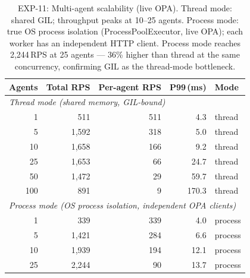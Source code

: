 \begin{table}[t]
\centering
\small
\caption{EXP-11: Multi-agent scalability (live OPA).
  Thread mode: shared GIL; throughput peaks at 10--25 agents.
  Process mode: true OS process isolation (ProcessPoolExecutor, live OPA);
  each worker has an independent HTTP client.
  Process mode reaches 2{,}244\,RPS at 25 agents — 36\% higher than thread
  at the same concurrency, confirming GIL as the thread-mode bottleneck.}
\label{tab:exp11-agents}
\begin{tabular}{rrrrl}
\hline
\textbf{Agents} & \textbf{Total RPS} & \textbf{Per-agent RPS} & \textbf{P99\,(ms)} & \textbf{Mode} \\
\hline
\multicolumn{5}{l}{\textit{Thread mode (shared memory, GIL-bound)}} \\
 1  &   511 &   511 &  4.3 & thread \\
 5  & 1{,}592 &   318 &  5.0 & thread \\
10  & 1{,}658 &   166 &  9.2 & thread \\
25  & 1{,}653 &    66 & 24.7 & thread \\
50  & 1{,}472 &    29 & 59.7 & thread \\
100 &   891 &     9 & 170.3 & thread \\
\hline
\multicolumn{5}{l}{\textit{Process mode (OS process isolation, independent OPA clients)}} \\
 1  &   339 &   339 &  4.0 & process \\
 5  & 1{,}421 &   284 &  6.6 & process \\
10  & 1{,}939 &   194 & 12.1 & process \\
25  & 2{,}244 &    90 & 13.7 & process \\
\hline
\end{tabular}
\end{table}

